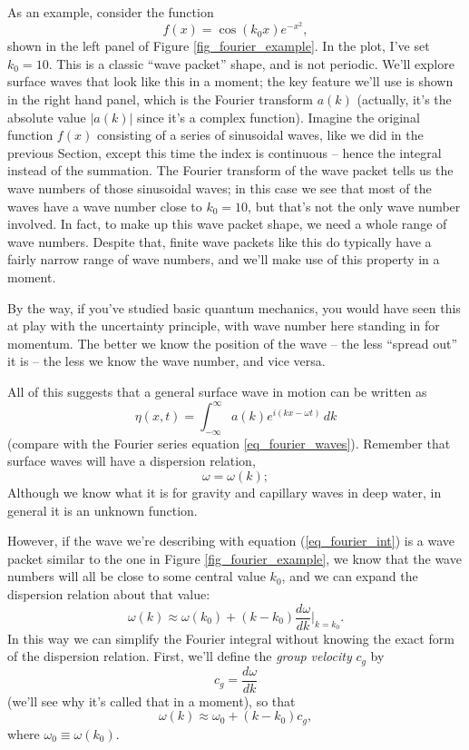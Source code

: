 As an example, consider the function
\[
f(x) = \cos(k_0 x) e^{-x^2},
\]
shown in the left panel of Figure \ref{fig_fourier_example}.  In the plot, I've set $k_0 = 10$.  This is a classic ``wave packet'' shape, and is not periodic.  We'll explore surface waves that look like this in a moment; the key feature we'll use is shown in the right hand panel, which is the Fourier transform $a(k)$ (actually, it's the absolute value $|a(k)|$ since it's a complex function).  Imagine the original function $f(x)$ consisting of a series of sinusoidal waves, like we did in the previous Section, except this time the index is continuous -- hence the integral instead of the summation.  The Fourier transform of the wave packet tells us the wave numbers of those sinusoidal waves; in this case we see that most of the waves have a wave number close to $k_0 = 10$, but that's not the only wave number involved.  In fact, to make up this wave packet shape, we need a whole range of wave numbers.  Despite that, finite wave packets like this do typically have a fairly narrow range of wave numbers, and we'll make use of this property in a moment.

By the way, if you've studied basic quantum mechanics, you would have seen this at play with the uncertainty principle, with wave number here standing in for momentum.  The better we know the position of the wave -- the less ``spread out'' it is -- the less we know the wave number, and vice versa.  

All of this suggests that a general surface wave in motion can be written as
\begin{equation}
\label{eq_fourier_int}
\eta (x, t) = \int_{-\infty}^\infty a(k) e^{i(kx - \omega t)} \, dk
\end{equation}
(compare with the Fourier series equation \ref{eq_fourier_waves}).  Remember that surface waves will have a dispersion relation,
\[
\omega = \omega (k);
\]
Although we know what it is for gravity and capillary waves in deep water, in general it is an unknown function.

However, if the wave we're describing with equation (\ref{eq_fourier_int}) is a wave packet similar to the one in Figure \ref{fig_fourier_example}, we know that the wave numbers will all be close to some central value $k_0$, and we can expand the dispersion relation about that value:
\[
\omega(k) \approx \omega(k_0) + (k - k_0) \frac{d\omega}{dk} \bigg|_{k=k_0}.
\]
In this way we can simplify the Fourier integral without knowing the exact form of the dispersion relation.  First, we'll define the \emph{group velocity} $c_g$ by
\begin{equation}
\boxed{
c_g = \frac{d\omega}{dk}
}
\end{equation}
(we'll see why it's called that in a moment), so that
\[
\omega(k) \approx \omega_0 + (k - k_0) c_g,
\]
where $\omega_0 \equiv \omega(k_0)$.

